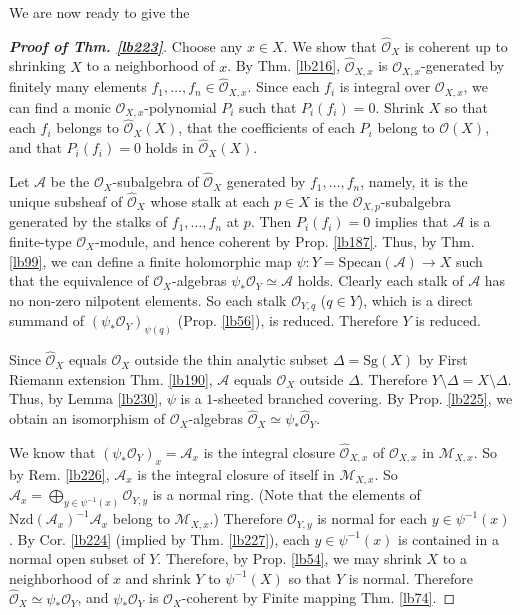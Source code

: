 \documentclass[12pt,b5paper,notitlepage]{report}
\theoremstyle{definition}
\theoremstyle{plain}
\newcommand{\scr}{\mathscr}
\newcommand{\Specan}{\mathrm{Specan}}
\newcommand{\Sg}{\mathrm{Sg}}
\newcommand{\Nzd}{\mathrm{Nzd}}
\newcommand{\Owht}{\widehat{\scr O}}
\numberwithin{equation}{section}
\begin{document}
We are now ready to give the

\begin{proof}[\textbf{Proof of Thm. \ref{lb223}}]
Choose any $x\in X$. We show that $\Owht_X$ is coherent up to shrinking $X$ to a neighborhood of $x$. By Thm. \ref{lb216}, $\Owht_{X,x}$ is $\scr O_{X,x}$-generated by finitely many elements $f_1,\dots,f_n\in\Owht_{X,x}$. Since each $f_i$ is integral over $\scr O_{X,x}$, we can find a monic $\scr O_{X,x}$-polynomial $P_i$ such that $P_i(f_i)=0$. Shrink $X$ so that each $f_i$ belongs to $\Owht_X(X)$, that the coefficients of each $P_i$ belong to $\scr O(X)$, and that $P_i(f_i)=0$ holds in $\Owht_X(X)$.

Let $\scr A$ be the $\scr O_X$-subalgebra of $\Owht_X$ generated by $f_1,\dots,f_n$, namely, it is the unique subsheaf of $\Owht_X$ whose stalk at each $p\in X$ is the $\scr O_{X,p}$-subalgebra generated by the stalks of $f_1,\dots,f_n$ at $p$. Then $P_i(f_i)=0$ implies that $\scr A$ is a finite-type $\scr O_X$-module, and hence coherent by Prop. \ref{lb187}. Thus, by Thm. \ref{lb99}, we can define a finite holomorphic map $\psi:Y=\Specan(\scr A)\rightarrow X$ such that the equivalence of $\scr O_X$-algebras $\psi_*\scr O_Y\simeq \scr A$ holds. Clearly each stalk of $\scr A$ has no non-zero nilpotent elements. So each stalk $\scr O_{Y,q}$ ($q\in Y$), which is a direct summand of $(\psi_*\scr O_Y)_{\psi(q)}$ (Prop. \ref{lb56}), is reduced. Therefore $Y$ is reduced.

Since $\Owht_X$ equals $\scr O_X$ outside the thin analytic subset $\Delta=\Sg(X)$ by First Riemann extension Thm. \ref{lb190}, $\scr A$ equals $\scr O_X$ outside $\Delta$. Therefore $Y\setminus \Delta=X\setminus\Delta$. Thus, by Lemma \ref{lb230}, $\psi$ is a $1$-sheeted branched covering. By Prop. \ref{lb225}, we obtain an isomorphism of $\scr O_X$-algebras $\Owht_X\simeq\psi_*\Owht_Y$.


We know that $(\psi_*\scr O_Y)_x=\scr A_x$ is the integral closure $\Owht_{X,x}$ of $\scr O_{X,x}$ in $\scr M_{X,x}$. So by Rem. \ref{lb226}, $\scr A_x$ is the integral closure of itself in $\scr M_{X,x}$. So $\scr A_x=\bigoplus_{y\in\psi^{-1}(x)}\scr O_{Y,y}$ is a normal ring. (Note that the elements of $\Nzd(\scr A_x)^{-1}\scr A_x$ belong to $\scr M_{X,x}$.) Therefore $\scr O_{Y,y}$ is normal for each $y\in \psi^{-1}(x)$. By Cor. \ref{lb224} (implied by Thm. \ref{lb227}), each $y\in\psi^{-1}(x)$ is contained in a normal open subset of $Y$. Therefore, by Prop. \ref{lb54}, we may shrink $X$ to a neighborhood of $x$ and shrink $Y$ to $\psi^{-1}(X)$ so that $Y$ is normal. Therefore $\Owht_X\simeq\psi_*\scr O_Y$, and $\psi_*\scr O_Y$ is $\scr O_X$-coherent by Finite mapping Thm. \ref{lb74}.
\end{proof}
\end{document}

